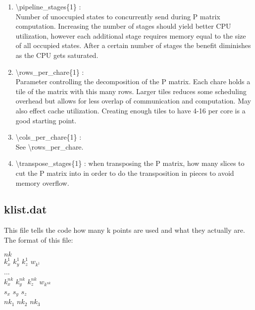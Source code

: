 \documentclass[letterpaper,12pt]{article}
\begin{document}
\begin{enumerate}

 \vspace{0.15in}
 \item   \textbackslash{}pipeline\_stages\{1\} : \\
 Number of unoccupied states to concurrently send during P matrix computation. Increasing the number of stages should yield better CPU utilization, however each additional stage requires memory equal to the size of all occupied states. After a certain number of stages the benefit diminishes as the CPU gets saturated.
 
 \vspace{0.15in}
 \item   \textbackslash{}rows\_per\_chare\{1\} : \\
 Parameter controlling the decomposition of the P matrix. Each chare holds a tile of the matrix with this many rows. Larger tiles reduces some scheduling overhead but allows for less overlap of communication and computation. May also effect cache utilization. Creating enough tiles to have 4-16 per core is a good starting point.
 
 \vspace{0.15in}
 \item   \textbackslash{}cols\_per\_chare\{1\} : \\
 See \textbackslash{}rows\_per\_chare.
 
 \vspace{0.15in}
 \item   \textbackslash{}transpose\_stages\{1\} : when transposing the P matrix, how many slices to cut the P matrix into in order to do the transposition in pieces to avoid memory overflow.\\

\end{enumerate}


\newpage
\subsection{klist.dat}

This file tells the code how many k points are used and what they actually are. 
The format of this file:


$nk$\\
$k^1_x$ $k^1_y$ $k^1_z$ $w_{k^1}$\\
...\\
$k^{nk}_x$ $k^{nk}_y$ $k^{nk}_z$ $w_{k^{nk}}$\\
$s_x$ $s_y$ $s_z$\\
$nk_1$ $nk_2$ $nk_3$
\end{document}
